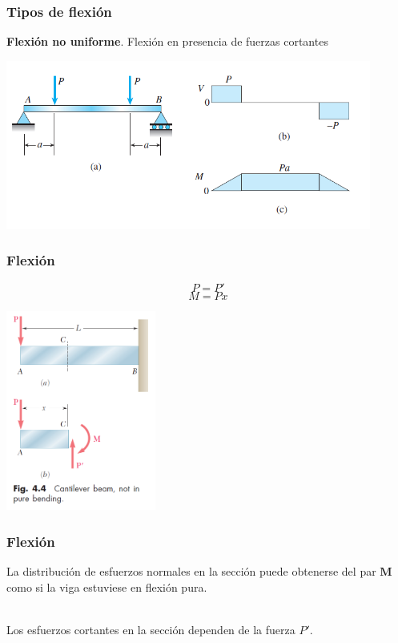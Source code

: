 \documentclass{beamer}
\begin{document}
\begin{frame}
\justifying
\frametitle{Tipos de flexión}

\textbf{Flexión no uniforme}. Flexión en presencia de fuerzas cortantes

\begin{center}
\includegraphics[width=0.9\textwidth]{img/viga_flexion_no_uniforme.PNG}
\end{center}
\end{frame}



\begin{frame}
\justifying
\frametitle{Flexión}

$$ P = P' $$
$$ M = Px $$

\begin{center}
\includegraphics[width=0.37\textwidth]{img/cantiliver_beam.PNG}
\end{center}

\end{frame}


\begin{frame}
\justifying
\frametitle{Flexión}
La distribución de esfuerzos normales en la sección puede obtenerse del par $\mathbf{M}$ como 
si la viga estuviese en flexión pura.

\hfill \\

Los esfuerzos cortantes en la sección dependen de la fuerza  $P'$.

\end{frame}
\end{document}
